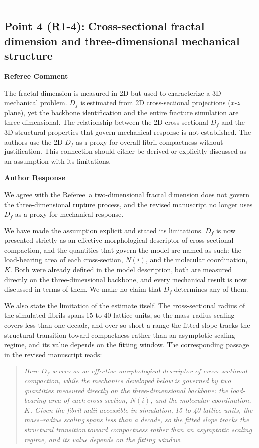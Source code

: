 \documentclass[11pt]{article}
\newenvironment{refereecomment}
  {%
    \par
    \begingroup
    \color{commentgray}
    \itshape
    \setlength{\leftskip}{1.4em}
    \setlength{\rightskip}{1.4em}
  }
  {%
    \par
    \endgroup
  }
\newcommand{\refereelabel}{%
  \par\smallskip
  {\color{commentgray}\bfseries Referee Comment}\par
}
\newcommand{\responselabel}{%
  \par\medskip
  {\color{responseblue}\bfseries Author Response}\par
}
\newcommand{\pointseparator}{%
  \par\bigskip
  {\color{rulegray}\hrule}
  \par\bigskip
}
\begin{document}
\pointseparator


\subsection*{Point 4 (R1-4): Cross-sectional fractal dimension and three-dimensional mechanical structure}

\refereelabel
\begin{refereecomment}
  The fractal dimension is measured in 2D but used to characterize a 3D
  mechanical problem. \(D_f\) is estimated from 2D cross-sectional projections
  (\(x\)-\(z\) plane), yet the backbone identification and the entire fracture
  simulation are three-dimensional. The relationship between the 2D
  cross-sectional \(D_f\) and the 3D structural properties that govern mechanical
  response is not established. The authors use the 2D \(D_f\) as a proxy for
  overall fibril compactness without justification. This connection should
  either be derived or explicitly discussed as an assumption with its
  limitations.
\end{refereecomment}

\responselabel

We agree with the Referee: a two-dimensional fractal dimension does not govern
the three-dimensional rupture process, and the revised manuscript no longer uses
$D_f$ as a proxy for mechanical response.

We have made the assumption explicit and stated its limitations. $D_f$ is now
presented strictly as an effective morphological descriptor of cross-sectional
compaction, and the quantities that govern the model are named as such: the
load-bearing area of each cross-section, $N(i)$, and the molecular coordination,
$K$. Both were already defined in the model description, both are measured
directly on the three-dimensional backbone, and every mechanical result is now
discussed in terms of them. We make no claim that $D_f$ determines any of them.

We also state the limitation of the estimate itself. The cross-sectional radius
of the simulated fibrils spans 15 to 40 lattice units, so the mass--radius
scaling covers less than one decade, and over so short a range the fitted slope
tracks the structural transition toward compactness rather than an asymptotic
scaling regime, and its value depends on the fitting window. The corresponding
passage in the revised manuscript reads:

\begin{quotation}\itshape
Here $D_f$ serves as an effective morphological descriptor of cross-sectional
compaction, while the mechanics developed below is governed by two quantities
measured directly on the three-dimensional backbone: the load-bearing area of
each cross-section, $N(i)$, and the molecular coordination, $K$. Given the
fibril radii accessible in simulation, 15 to 40 lattice units, the mass--radius
scaling spans less than a decade, so the fitted slope tracks the structural
transition toward compactness rather than an asymptotic scaling regime, and its
value depends on the fitting window.
\end{quotation}
\end{document}
